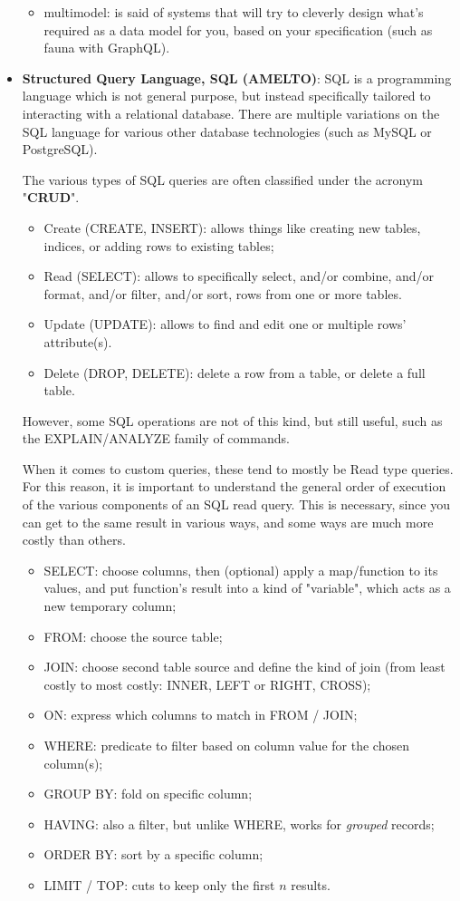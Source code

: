 \documentclass{article}
\begin{document}
\begin{itemize}
\begin{itemize}
		\item multimodel: is said of systems that will try to cleverly design what's required as a data model for you, based on your specification (such as fauna with GraphQL).
	\end{itemize}

	\item \textbf{Structured Query Language, SQL (AMELTO)}: SQL is a programming language which is not general purpose, but instead specifically tailored to interacting with a relational database. There are multiple variations on the SQL language for various other database technologies (such as MySQL or PostgreSQL).

	The various types of SQL queries are often classified under the acronym "\textbf{CRUD}".
	\begin{itemize}
		\item Create (CREATE, INSERT): allows things like creating new tables, indices, or adding rows to existing tables;
		\item Read (SELECT): allows to specifically select, and/or combine, and/or format, and/or filter, and/or sort, rows from one or more tables.
		\item Update (UPDATE): allows to find and edit one or multiple rows' attribute(s).
		\item Delete (DROP, DELETE): delete a row from a table, or delete a full table.
	\end{itemize}
	However, some SQL operations are not of this kind, but still useful, such as the EXPLAIN/ANALYZE family of commands.

	When it comes to custom queries, these tend to mostly be Read type queries. For this reason, it is important to understand the general order of execution of the various components of an SQL read query. This is necessary, since you can get to the same result in various ways, and some ways are much more costly than others.
	\begin{itemize}
		\item SELECT: choose columns, then (optional) apply a map/function to its values, and put function's result into a kind of "variable", which acts as a new temporary column;
		\item FROM: choose the source table;
		\item JOIN: choose second table source and define the kind of join (from least costly to most costly: INNER, LEFT or RIGHT, CROSS);
		\item ON: express which columns to match in FROM / JOIN;
		\item WHERE: predicate to filter based on column value for the chosen column(s);
		\item GROUP BY: fold on specific column;
		\item HAVING: also a filter, but unlike WHERE, works for \textit{grouped} records;
		\item ORDER BY: sort by a specific column;
		\item LIMIT / TOP: cuts to keep only the first $n$ results.
	\end{itemize}


\end{itemize}
\end{document}
